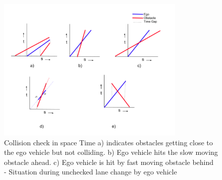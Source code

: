 

\begin{figure}[h]
    \centering
    \includegraphics[width=0.8\textwidth]{Images/dynamic_Check_time.png}
    \caption{Collision check in space Time a) indicates obstacles getting close to the ego vehicle but not colliding. b) Ego vehicle hits the slow moving obstacle ahead. c) Ego vehicle is hit by fast moving obstacle behind - Situation during unchecked lane change by ego vehicle }
    \label{dynamic_time_check}
\end{figure}









